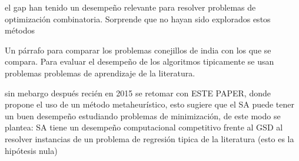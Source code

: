 el gap
han tenido un desempeño relevante para resolver problemas de optimización combinatoria. Sorprende que no hayan sido explorados estos métodos

Un párrafo para comparar los problemas conejillos de india con los que se compara. Para evaluar el desempeño de los algoritmos tipicamente se usan problemas problemas de aprendizaje de la literatura.

sin mebargo después recién en 2015 se retomar con ESTE PAPER, donde propone el uso de un método metaheurístico, esto sugiere que el SA puede tener un buen desempeño estudiando problemas de minimización, de este modo se plantea: SA tiene un desempeño computacional competitivo frente al GSD al resolver instancias de un problema de regresión tipica de la literatura (esto es la hipótesis nula)






